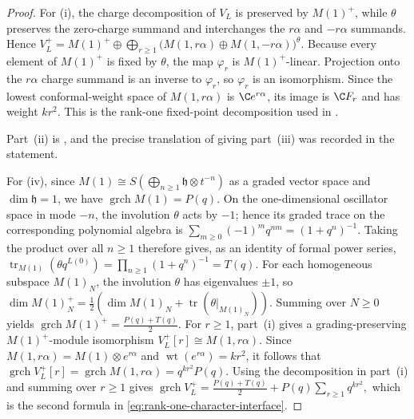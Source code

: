 \documentclass[12pt,leqno]{amsart}
\numberwithin{equation}{section} \newtheorem{thm}{Theorem}[section] \newtheorem{lem}[thm]{Lemma} \newtheorem{ex}[thm]{Example} \newtheorem{prop}[thm]{Proposition} \newtheorem{cor}[thm]{Corollary} \newtheorem{defi}[thm]{Definition} \newtheorem{rmk}[thm]{Remark} \newtheorem{notation}[thm]{Notation}
\newcommand{\wt}{\operatorname{wt}}
\newcommand{\grch}{\operatorname{grch}}
\begin{document}
\begin{proof}
For \textnormal{(i)}, the charge decomposition of $V_L$ is preserved by $M(1)^+$, while $\theta$ preserves the zero-charge summand and interchanges the $r\alpha$ and $-r\alpha$ summands. Hence \(V_L^+=M(1)^+\oplus\bigoplus_{r\ge1}\bigl(M(1,r\alpha)\oplus M(1,-r\alpha)\bigr)^\theta\). Because every element of $M(1)^+$ is fixed by $\theta$, the map $\varphi_r$ is $M(1)^+$-linear. Projection onto the $r\alpha$ charge summand is an inverse to $\varphi_r$, so $\varphi_r$ is an isomorphism. Since the lowest conformal-weight space of $M(1,r\alpha)$ is $\C e^{r\alpha}$, its image is $\C F_r$ and has weight $kr^2$. This is the rank-one fixed-point decomposition used in \cite[Section~2]{DG98}.

Part~\textnormal{(ii)} is \cite[Theorem~2.7(1)]{DG98}, and the precise translation of \cite[Theorems~2.7(2) and~2.9]{DG98} giving part~\textnormal{(iii)} was recorded in the statement.

For \textnormal{(iv)}, since $ M(1)\cong S\!\left(\bigoplus_{n\ge1}\mathfrak h\otimes t^{-n}\right) $ as a graded vector space and $\dim\mathfrak h=1$, we have $\grch M(1)=P(q)$. On the one-dimensional oscillator space in mode $-n$, the involution $\theta$ acts by $-1$; hence its graded trace on the corresponding polynomial algebra is $ \sum_{m\ge0}(-1)^m q^{nm}=(1+q^n)^{-1}. $ Taking the product over all $n\ge1$ therefore gives, as an identity of formal power series, $ \operatorname{tr}_{M(1)}\!\left(\theta q^{L(0)}\right) =\prod_{n\ge1}(1+q^n)^{-1}=T(q). $ For each homogeneous subspace $M(1)_N$, the involution $\theta$ has eigenvalues $\pm1$, so $ \dim M(1)_N^+ =\frac12\left(\dim M(1)_N+ \operatorname{tr}\!\left(\theta|_{M(1)_N}\right)\right). $ Summing over $N\ge0$ yields $ \grch M(1)^+=\frac{P(q)+T(q)}2. $ For $r\ge1$, part~\textnormal{(i)} gives a grading-preserving $M(1)^+$-module isomorphism $V_L^+[r]\cong M(1,r\alpha)$. Since $M(1,r\alpha)=M(1)\otimes e^{r\alpha}$ and $\wt(e^{r\alpha})=kr^2$, it follows that $ \grch V_L^+[r] =\grch M(1,r\alpha) =q^{kr^2}P(q). $ Using the decomposition in part~\textnormal{(i)} and summing over $r\ge1$ gives $ \grch V_L^+ =\frac{P(q)+T(q)}2+ P(q)\sum_{r\ge1}q^{kr^2}, $ which is the second formula in \eqref{eq:rank-one-character-interface}.


\end{proof}
\end{document}
